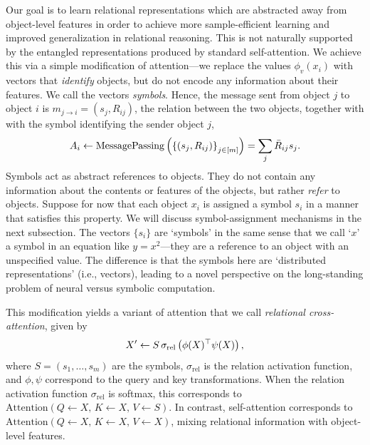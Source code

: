 Our goal is to learn relational representations which are abstracted away from object-level features in order to achieve more sample-efficient learning and improved generalization in relational reasoning. This is not naturally supported by the entangled representations produced by standard self-attention. We achieve this via a simple modification of attention---we replace the values $\phi_v(x_i)$ with vectors that \textit{identify} objects, but do not encode any information about their features. We call the vectors \textit{symbols}. Hence, the message sent from object $j$ to object $i$ is $m_{j \to i} = (s_j, R_{ij})$, the relation between the two objects, together with with the symbol identifying the sender object $j$,
\begin{equation}\label{eq:relational_crossattn_message_passing}
    A_i \gets \mathrm{MessagePassing}\left(\left\{(s_j, R_{ij})\right\}_{j \in [m]}\right) = \sum_{j} \bar{R}_{ij} s_j.
\end{equation}
Symbols act as abstract references to objects. They do not contain any information about the contents or features of the objects, but rather \textit{refer} to objects.
Suppose for now that each object $x_i$ is assigned a symbol $s_i$ in a manner that satisfies this property. We will discuss symbol-assignment mechanisms in the next subsection.
The vectors $\{s_i\}$ are `symbols' in the same sense that we call `$x$' a symbol in an equation like $y = x^2$---they are a reference to an object with an unspecified value. The difference is that the symbols here are `distributed representations' (i.e., vectors), leading to a novel perspective on the long-standing problem of neural versus symbolic computation.

This modification yields a variant of attention that we call \textit{relational cross-attention}, given by
\begin{equation}\label{eq:relational_crossattn}
    X' \gets S \, \sigma_{\mathrm{rel}}\left(\phi(X)^\top \psi(X)\right),
\end{equation}
where $S = (s_1, \ldots, s_m)$ are the symbols, $\sigma_{\mathrm{rel}}$ is the relation activation function, and $\phi, \psi$ correspond to the query and key transformations. When the relation activation function $\sigma_{\mathrm{rel}}$ is softmax, this corresponds to $\mathrm{Attention}(Q \gets X,\, K \gets X,\, V \gets S)$. In contrast, self-attention corresponds to $\mathrm{Attention}(Q \gets X,\, K \gets X,\, V \gets X)$, mixing relational information with object-level features.


